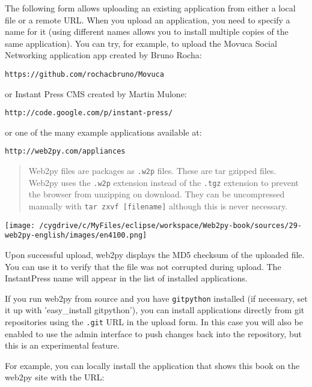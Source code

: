 \documentclass[justified,sixbynine,notoc]{tufte-book}
\def\ft{\small\tt}
\def\inxx#1{\index{#1}}
\begin{document}
\begin{fullwidth}
\inxx{Instant Press} \inxx{Movuca}
The following form allows uploading an existing application from either a local file or a remote URL. When you upload an application, you need to specify a name for it (using different names
allows you to install multiple copies of the same application). You can try, for example, to upload the Movuca Social Networking application app created by Bruno Rocha:

\begin{lstlisting}[keywords={}]
https://github.com/rochacbruno/Movuca
\end{lstlisting}
\noindent or Instant Press CMS created by Martin Mulone:

\begin{lstlisting}[keywords={}]
http://code.google.com/p/instant-press/
\end{lstlisting}
\noindent or one of the many example applications available at:

\begin{lstlisting}[keywords={}]
http://web2py.com/appliances
\end{lstlisting}

\begin{quote}Web2py files are packages as {\ft .w2p} files. These are tar gzipped files. Web2py uses the {\ft .w2p} extension instead of the {\ft .tgz} extension to prevent the browser from unzipping on download. They can be uncompressed manually with {\ft tar zxvf [filename]} although this is never necessary.\end{quote}

\goodbreak\begin{center}\texttt{[image: /cygdrive/c/MyFiles/eclipse/workspace/Web2py-book/sources/29-web2py-english/images/en4100.png]}\end{center}


Upon successful upload, web2py displays the MD5 checksum of the uploaded file. You can use it to verify that the file was not corrupted during upload. The InstantPress name will appear in the list of installed applications.

If you run web2py from source and you have {\ft gitpython} installed (if necessary, set it up with 'easy\_install gitpython'), you can install applications directly from git repositories
using the {\ft .git} URL in the upload form. In this case you will also be enabled to use the admin interface to push changes back into the repository, but this is an experimental feature.

For example, you can locally install the application that shows this book on the web2py site with the URL:


\end{fullwidth}
\end{document}
